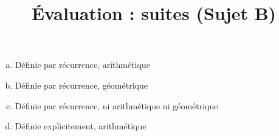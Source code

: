 \documentclass[
	classe=$1^{ere}STI2D$
]{évaluation}
\begin{document}
\newpage
\setcounter{exercice}{1}

\title{Évaluation : suites (Sujet B)}
\maketitle

\begin{exercice}
	\begin{enumerate}[a)]
		\item Définie par récurrence, arithmétique
		\item Définie par récurrence, géométrique
		\item Définie par récurrence, ni arithmétique ni géométrique
		\item Définie explicitement, arithmétique
	\end{enumerate}
\end{exercice}
\end{document}
